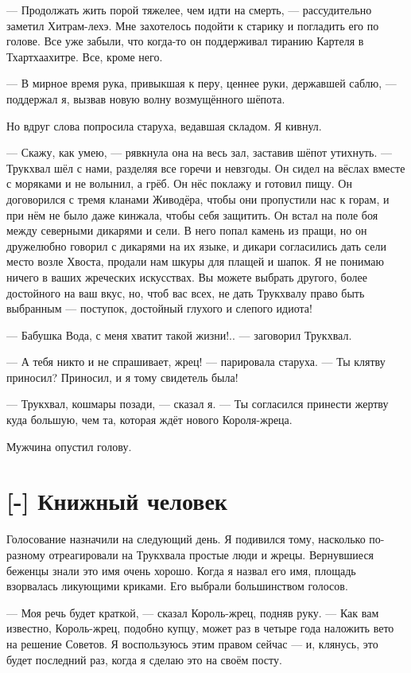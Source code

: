 --- Продолжать жить порой тяжелее, чем идти на смерть, --- рассудительно заметил Хитрам-лехэ.
Мне захотелось подойти к старику и погладить его по голове.
Все уже забыли, что когда-то он поддерживал тиранию Картеля в Тхартхаахитре.
Все, кроме него.

--- В мирное время рука, привыкшая к перу, ценнее руки, державшей саблю, --- поддержал я, вызвав новую волну возмущённого шёпота.

Но вдруг слова попросила старуха, ведавшая складом.
Я кивнул.

--- Скажу, как умею, --- рявкнула она на весь зал, заставив шёпот утихнуть.
--- Трукхвал шёл с нами, разделяя все горечи и невзгоды.
Он сидел на вёслах вместе с моряками и не волынил, а грёб.
Он нёс поклажу и готовил пищу.
Он договорился с тремя кланами Живодёра, чтобы они пропустили нас к горам, и при нём не было даже кинжала, чтобы себя защитить.
Он встал на поле боя между северными дикарями и сели.
В него попал камень из пращи, но он дружелюбно говорил с дикарями на их языке, и дикари согласились дать сели место возле Хвоста, продали нам шкуры для плащей и шапок.
Я не понимаю ничего в ваших жреческих искусствах.
Вы можете выбрать другого, более достойного на ваш вкус, но, чтоб вас всех, не дать Трукхвалу право быть выбранным --- поступок, достойный глухого и слепого идиота!

--- Бабушка Вода, с меня хватит такой жизни!.. --- заговорил Трукхвал.

--- А тебя никто и не спрашивает, жрец! --- парировала старуха.
--- Ты клятву приносил?
Приносил, и я тому свидетель была!

--- Трукхвал, кошмары позади, --- сказал я.
--- Ты согласился принести жертву куда большую, чем та, которая ждёт нового Короля-жреца.

Мужчина опустил голову.

\section{[-] Книжный человек}

Голосование назначили на следующий день.
Я подивился тому, насколько по-разному отреагировали на Трукхвала простые люди и жрецы.
Вернувшиеся беженцы знали это имя очень хорошо.
Когда я назвал его имя, площадь взорвалась ликующими криками.
Его выбрали большинством голосов.

--- Моя речь будет краткой, --- сказал Король-жрец, подняв руку.
--- Как вам известно, Король-жрец, подобно купцу, может раз в четыре года наложить вето на решение Советов.
Я воспользуюсь этим правом сейчас --- и, клянусь, это будет последний раз, когда я сделаю это на своём посту.

